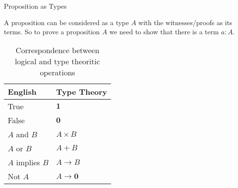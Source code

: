 \documentclass[10pt]{beamer}
\theoremstyle{definition}
\theoremstyle{definition}
\begin{document}

\begin{frame}{Proposition as Types}\label{prop as types}

\begin{block}{}
A proposition can be considered as a type $A$ with 
the witnesses/proofs as its terms. So to prove a proposition $A$ we need to show that 
there is a term $a : A$.
\end{block}

\begin{block}

\begin{table}
\caption{Correspondence between logical and type theoritic operations}
\begin{tabular}{ l | l }

\hline
English & Type Theory \\ 
\hline
 
True & $\mathbf{1}$ \\

False & $\mathbf{0}$ \\

$A$ and $B$ & $A \times B$ \\

$A$ or $B$ & $A + B$ \\

$A$ implies $B$ & $A \to B$ \\

Not $A$ & $A \to \mathbf{0}$

\end{tabular}

\end{table}


\end{block}

\end{frame}


\end{document}
